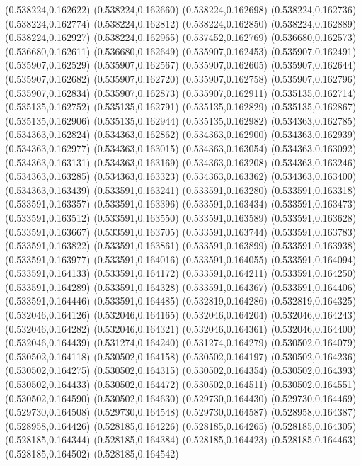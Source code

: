 (0.538224,0.162622)
(0.538224,0.162660)
(0.538224,0.162698)
(0.538224,0.162736)
(0.538224,0.162774)
(0.538224,0.162812)
(0.538224,0.162850)
(0.538224,0.162889)
(0.538224,0.162927)
(0.538224,0.162965)
(0.537452,0.162769)
(0.536680,0.162573)
(0.536680,0.162611)
(0.536680,0.162649)
(0.535907,0.162453)
(0.535907,0.162491)
(0.535907,0.162529)
(0.535907,0.162567)
(0.535907,0.162605)
(0.535907,0.162644)
(0.535907,0.162682)
(0.535907,0.162720)
(0.535907,0.162758)
(0.535907,0.162796)
(0.535907,0.162834)
(0.535907,0.162873)
(0.535907,0.162911)
(0.535135,0.162714)
(0.535135,0.162752)
(0.535135,0.162791)
(0.535135,0.162829)
(0.535135,0.162867)
(0.535135,0.162906)
(0.535135,0.162944)
(0.535135,0.162982)
(0.534363,0.162785)
(0.534363,0.162824)
(0.534363,0.162862)
(0.534363,0.162900)
(0.534363,0.162939)
(0.534363,0.162977)
(0.534363,0.163015)
(0.534363,0.163054)
(0.534363,0.163092)
(0.534363,0.163131)
(0.534363,0.163169)
(0.534363,0.163208)
(0.534363,0.163246)
(0.534363,0.163285)
(0.534363,0.163323)
(0.534363,0.163362)
(0.534363,0.163400)
(0.534363,0.163439)
(0.533591,0.163241)
(0.533591,0.163280)
(0.533591,0.163318)
(0.533591,0.163357)
(0.533591,0.163396)
(0.533591,0.163434)
(0.533591,0.163473)
(0.533591,0.163512)
(0.533591,0.163550)
(0.533591,0.163589)
(0.533591,0.163628)
(0.533591,0.163667)
(0.533591,0.163705)
(0.533591,0.163744)
(0.533591,0.163783)
(0.533591,0.163822)
(0.533591,0.163861)
(0.533591,0.163899)
(0.533591,0.163938)
(0.533591,0.163977)
(0.533591,0.164016)
(0.533591,0.164055)
(0.533591,0.164094)
(0.533591,0.164133)
(0.533591,0.164172)
(0.533591,0.164211)
(0.533591,0.164250)
(0.533591,0.164289)
(0.533591,0.164328)
(0.533591,0.164367)
(0.533591,0.164406)
(0.533591,0.164446)
(0.533591,0.164485)
(0.532819,0.164286)
(0.532819,0.164325)
(0.532046,0.164126)
(0.532046,0.164165)
(0.532046,0.164204)
(0.532046,0.164243)
(0.532046,0.164282)
(0.532046,0.164321)
(0.532046,0.164361)
(0.532046,0.164400)
(0.532046,0.164439)
(0.531274,0.164240)
(0.531274,0.164279)
(0.530502,0.164079)
(0.530502,0.164118)
(0.530502,0.164158)
(0.530502,0.164197)
(0.530502,0.164236)
(0.530502,0.164275)
(0.530502,0.164315)
(0.530502,0.164354)
(0.530502,0.164393)
(0.530502,0.164433)
(0.530502,0.164472)
(0.530502,0.164511)
(0.530502,0.164551)
(0.530502,0.164590)
(0.530502,0.164630)
(0.529730,0.164430)
(0.529730,0.164469)
(0.529730,0.164508)
(0.529730,0.164548)
(0.529730,0.164587)
(0.528958,0.164387)
(0.528958,0.164426)
(0.528185,0.164226)
(0.528185,0.164265)
(0.528185,0.164305)
(0.528185,0.164344)
(0.528185,0.164384)
(0.528185,0.164423)
(0.528185,0.164463)
(0.528185,0.164502)
(0.528185,0.164542)
